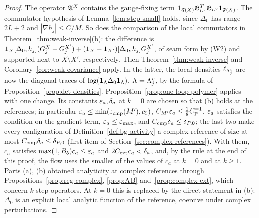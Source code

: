 \begin{proof}
The operator $\mathfrak A^X$ contains the gauge-fixing term $\mathbf 1_{\mathfrak F(X)}\mathfrak G_{U'}^T\mathfrak G_{U'}\mathbf 1_{\mathfrak F(X)}$. The commutator hypothesis of Lemma~\ref{lem:step-small} holds, since $\Delta_0$ has range $2L+2$ and $|\nabla h_j|\le C/M$. So does the comparison of the local commutators in Theorem~\ref{thm:weak-inverse}(b): the difference is $\mathbf 1_X[\Delta_0,h_j](G^X_j-G^{X'}_j)+(\mathbf 1_X-\mathbf 1_{X'})[\Delta_0,h_j]G^{X'}_j$, of seam form by (W2) and supported next to $X\setminus X'$, respectively. Then Theorem~\ref{thm:weak-inverse} and Corollary~\ref{cor:weak-covariance} apply. In the latter, the local densities $\ell_{\Lambda^v_j}$ are now the diagonal traces of $\log(\mathbf 1_\Lambda\Delta_0\mathbf 1_\Lambda)$, $\Lambda=\Lambda^v_j$, by the formula of Proposition~\ref{prop:det-densities}. Proposition~\ref{prop:one-loop-polymer} applies with one change. Its constants $\varepsilon_a,\delta_a$ at $k=0$ are chosen so that (b) holds at the references; in particular $\varepsilon_a\le\min(\varepsilon_{\rm cmp}(M'),c_5)$, $C_{M'}\varepsilon_a\le\frac18C_{\rm P}^{-1}$, $\varepsilon_a$ satisfies the condition on the gradient term, $\varepsilon_a\le\varepsilon_{\max}$, and $C_{\rm cmp}\delta_a\le\delta_{P,0}$; the last two make every configuration of Definition~\ref{def:bg-activity} a complex reference of size at most $C_{\rm cmp}\delta_a\le\delta_{P,0}$ (first item of Section~\ref{sec:complex-references}). With them, $c_a$ satisfies $\max(1,B_5)c_a\le\varepsilon_a$ and $2C_{\rm ext}c_a<\delta_a$, and, by the rule at the end of this proof, the flow uses the smaller of the values of $c_a$ at $k=0$ and at $k\ge1$. Parts (a), (b) obtained analyticity at complex references through Propositions~\ref{prop:reg-complex}, \ref{prop:AB} and~\ref{prop:complex-ext}, which concern $k$-step operators. At $k=0$ this is replaced by the direct statement in (b): $\Delta_0$ is an explicit local analytic function of the reference, coercive under complex perturbations.


\end{proof}
